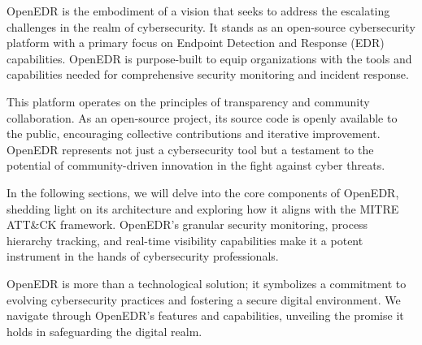 \documentclass{article}
\begin{document}
OpenEDR is the embodiment of a vision that seeks to address the escalating challenges in the realm of cybersecurity. It stands as an open-source cybersecurity platform with a primary focus on Endpoint Detection and Response (EDR) capabilities. OpenEDR is purpose-built to equip organizations with the tools and capabilities needed for comprehensive security monitoring and incident response.

This platform operates on the principles of transparency and community collaboration. As an open-source project, its source code is openly available to the public, encouraging collective contributions and iterative improvement. OpenEDR represents not just a cybersecurity tool but a testament to the potential of community-driven innovation in the fight against cyber threats.

In the following sections, we will delve into the core components of OpenEDR, shedding light on its architecture and exploring how it aligns with the MITRE ATT\&CK framework. OpenEDR's granular security monitoring, process hierarchy tracking, and real-time visibility capabilities make it a potent instrument in the hands of cybersecurity professionals.

OpenEDR is more than a technological solution; it symbolizes a commitment to evolving cybersecurity practices and fostering a secure digital environment. We navigate through OpenEDR's features and capabilities, unveiling the promise it holds in safeguarding the digital realm.
\end{document}
